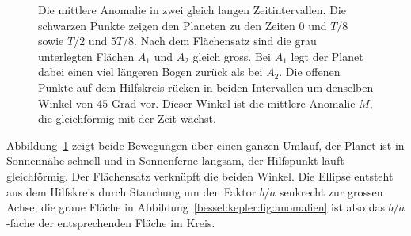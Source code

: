 \begin{figure}
\centering
{}
\caption{Die mittlere Anomalie in zwei gleich langen Zeitintervallen.
Die schwarzen Punkte zeigen den Planeten zu den Zeiten $0$ und $T/8$ sowie $T/2$ und $5T/8$.
Nach dem Flächensatz sind die grau unterlegten Flächen $A_1$ und $A_2$ gleich gross.
Bei $A_1$ legt der Planet dabei einen viel längeren Bogen zurück als bei $A_2$.
Die offenen Punkte auf dem Hilfskreis rücken in beiden Intervallen um denselben Winkel von $45$ Grad vor.
Dieser Winkel ist die mittlere Anomalie $M$, die gleichförmig mit der Zeit wächst.
\label{bessel:kepler:fig:mittlere}}
\end{figure}
Abbildung~\ref{bessel:kepler:fig:mittlere} zeigt beide Bewegungen über einen ganzen Umlauf, der Planet ist in Sonnennähe schnell und in Sonnenferne langsam, der Hilfspunkt läuft gleichförmig.
Der Flächensatz verknüpft die beiden Winkel.
Die Ellipse entsteht aus dem Hilfskreis durch Stauchung um den Faktor $b/a$ senkrecht zur grossen Achse, die graue Fläche in Abbildung~\ref{bessel:kepler:fig:anomalien} ist also das $b/a$-fache der entsprechenden Fläche im Kreis.
